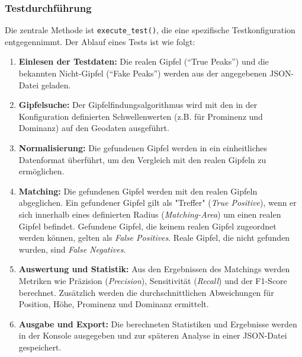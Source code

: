 \subsubsection{Testdurchführung}
Die zentrale Methode ist \verb|execute_test()|, die eine spezifische Testkonfiguration entgegennimmt. Der Ablauf eines Tests ist wie folgt:
\begin{enumerate}
    \item \textbf{Einlesen der Testdaten:} Die realen Gipfel (\enquote{True Peaks}) und die bekannten Nicht-Gipfel (\enquote{Fake Peaks}) werden aus der angegebenen JSON-Datei geladen.
    \item \textbf{Gipfelsuche:} Der Gipfelfindungsalgorithmus wird mit den in der Konfiguration definierten Schwellenwerten (z.B. für Prominenz und Dominanz) auf den Geodaten ausgeführt.
    \item \textbf{Normalisierung:} Die gefundenen Gipfel werden in ein einheitliches Datenformat überführt, um den Vergleich mit den realen Gipfeln zu ermöglichen.
    \item \textbf{Matching:} Die gefundenen Gipfel werden mit den realen Gipfeln abgeglichen. Ein gefundener Gipfel gilt als "Treffer" (\textit{True Positive}), wenn er sich innerhalb eines definierten Radius (\textit{Matching-Area}) um einen realen Gipfel befindet. Gefundene Gipfel, die keinem realen Gipfel zugeordnet werden können, gelten als \textit{False Positives}. Reale Gipfel, die nicht gefunden wurden, sind \textit{False Negatives}.
    \item \textbf{Auswertung und Statistik:} Aus den Ergebnissen des Matchings werden Metriken wie Präzision (\textit{Precision}), Sensitivität (\textit{Recall}) und der F1-Score berechnet. Zusätzlich werden die durchschnittlichen Abweichungen für Position, Höhe, Prominenz und Dominanz ermittelt.
    \item \textbf{Ausgabe und Export:} Die berechneten Statistiken und Ergebnisse werden in der Konsole ausgegeben und zur späteren Analyse in einer JSON-Datei gespeichert.
\end{enumerate} 
